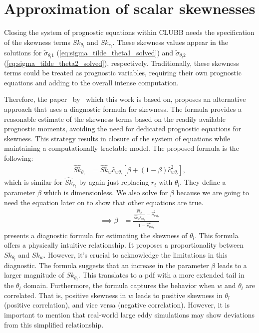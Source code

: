 \section{Approximation of scalar skewnesses}\label{sec:approximation-of-scalar-skewnesses}

Closing the system of prognostic equations within \gls{CLUBB} needs the specification of
the skewness terms $Sk_{\theta_l}$ and $Sk_{r_t}$.
These skewness values appear in the solutions for $\tilde{\sigma}_{\theta_l 1}$ (\cref{eq:sigma_tilde_theta1_solved})
and $\tilde{\sigma}_{\theta_l 2}$ (\cref{eq:sigma_tilde_theta2_solved}), respectively.
Traditionally, these skewness terms could be treated as prognostic variables,
requiring their own prognostic equations and adding to the overall intense computation.

Therefore, the paper~ by~\citeauthor{larson2005using} which this work is based on,
proposes an alternative approach that uses a diagnostic formula for skewness.
The formula provides a reasonable estimate of the skewness terms
based on the readily available prognostic moments,
avoiding the need for dedicated prognostic equations for skewness.
This strategy results in closure of the system of equations
while maintaining a computationally tractable model.
The proposed formula is the following:
\begin{align}
    \label{eq:Sk_hat_thl_beta}
    \widehat{Sk}_{\theta_l}
    &= \widehat{Sk}_w \widehat{c}_{w \theta_l} \left[\beta + (1-\beta) \widehat{c}_{w \theta_l}^2 \right],
\end{align}
which is similar for $\widehat{Sk}_{r_t}$ by again just replacing $r_t$ with $\theta_l$.
They define a parameter $\beta$ which is dimensionless.
We also solve for $\beta$ because we are going to need the equation later on to show that other equations are true.
\begin{align}
    \label{eq:beta}
    \implies \beta
    &=\frac{
        \frac{\widehat{Sk}_{\theta_l}}{\widehat{Sk}_w \widehat{c}_{w \theta_l}} - \widehat{c}_{w \theta_l}^2}
    {1 - \widehat{c}_{w \theta_l}^2}
\end{align}
 presents a diagnostic formula for estimating the skewness of $\theta_l$.
This formula offers a physically intuitive relationship.
It proposes a proportionality between $Sk_{\theta_l}$ and $Sk_w$.
However, it's crucial to acknowledge the limitations in this diagnostic.
The formula suggests that an increase in the parameter $\beta$ leads to a larger magnitude of $Sk_{\theta_l}$.
This translates to a \gls{pdf} with a more extended tail in the $\theta_l$ domain.
Furthermore, the formula captures the behavior when $w$
and $\theta_l$ are correlated.
That is, positive skewness in $w$ leads to positive skewness in $\theta_l$ (positive correlation),
and vice versa (negative correlation).
However, it is important to mention that real-world large eddy simulations
may show deviations from this simplified relationship.

